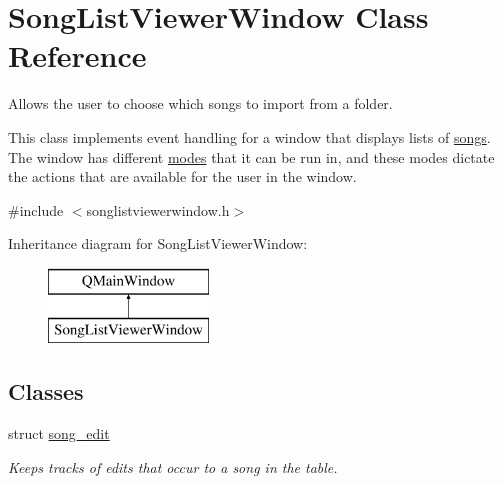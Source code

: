 \hypertarget{class_song_list_viewer_window}{}\section{Song\+List\+Viewer\+Window Class Reference}
\label{class_song_list_viewer_window}


Allows the user to choose which songs to import from a folder.

This class implements event handling for a window that displays lists of \mbox{\hyperlink{class_song}{songs}}. The window has different \mbox{\hyperlink{class_song_list_viewer_window_a6f23a68c416173f6b571a2cc4990a927}{modes}} that it can be run in, and these modes dictate the actions that are available for the user in the window.  




{\ttfamily \#include $<$songlistviewerwindow.\+h$>$}

Inheritance diagram for Song\+List\+Viewer\+Window\+:\begin{figure}[H]
\begin{center}
\leavevmode
\includegraphics[height=2.000000cm]{da/dcb/class_song_list_viewer_window}
\end{center}
\end{figure}
\subsection*{Classes}
\begin{DoxyCompactItemize}
\item 
struct \mbox{\hyperlink{struct_song_list_viewer_window_1_1song__edit}{song\+\_\+edit}}
\begin{DoxyCompactList}\small\item\em Keeps tracks of edits that occur to a song in the table. \end{DoxyCompactList}\end{DoxyCompactItemize}
